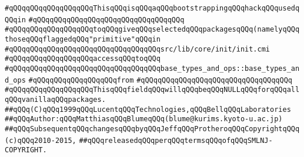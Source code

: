 \verb|#qQQqqQQqqQQqqQQqqQQqThisqQQqisqQQqaqQQqbootstrappingqQQqhackqQQqusedqQQqin|\newline
\verb|#qQQqqQQqqQQqqQQqqQQqqQQqqQQqqQQqqQQq|\newline
\verb|#qQQqqQQqqQQqqQQqqQQqtoqQQqgiveqQQqselectedqQQqpackagesqQQq(namelyqQQqthoseqQQqflaggedqQQq"primitive"qQQqin|\newline
\verb|#qQQqqQQqqQQqqQQqqQQqqQQqqQQqqQQqqQQqsrc/lib/core/init/init.cmi|\newline
\verb|#qQQqqQQqqQQqqQQqqQQqaccessqQQqtoqQQq|\newline
\verb|#qQQqqQQqqQQqqQQqqQQqqQQqqQQqqQQqqQQqbase_types_and_ops::base_types_and_ops|\newline
\verb|#qQQqqQQqqQQqqQQqqQQqfrom|\newline
\verb|#qQQqqQQqqQQqqQQqqQQqqQQqqQQqqQQqqQQq|\newline
\verb|#qQQqqQQqqQQqqQQqqQQqThisqQQqfieldqQQqwillqQQqbeqQQqNULLqQQqforqQQqallqQQqvanillaqQQqpackages.|\newline
\newline
\newline
\newline
\verb|##qQQq(C)qQQq1999qQQqLucentqQQqTechnologies,qQQqBellqQQqLaboratories|\newline
\verb|##qQQqAuthor:qQQqMatthiasqQQqBlumeqQQq(blume@kurims.kyoto-u.ac.jp)|\newline
\verb|##qQQqSubsequentqQQqchangesqQQqbyqQQqJeffqQQqProtheroqQQqCopyrightqQQq(c)qQQq2010-2015,|\newline
\verb|##qQQqreleasedqQQqperqQQqtermsqQQqofqQQqSMLNJ-COPYRIGHT.|\newline
\newline

